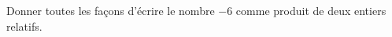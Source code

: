 
\begin{exercice}\label{exosmath-0801}

    Donner toutes les façons d'écrire le nombre \( -6\) comme produit de deux entiers relatifs.

\end{exercice}

